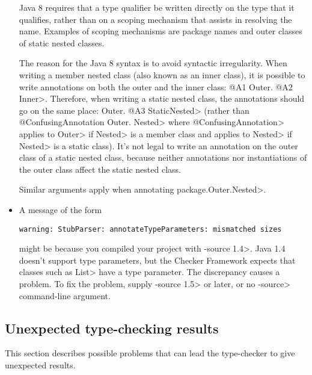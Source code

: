 \begin{itemize}
Java 8 requires that a type qualifier be written directly on the type that
it qualifies, rather than on a scoping mechanism that assists in resolving
the name.  Examples of scoping mechanisms are package names and outer
classes of static nested classes.

The reason for the Java 8 syntax is to avoid syntactic irregularity.  When
writing a member nested class (also known as an inner class), it is
possible to write annotations on both the outer and the inner class:  \<@A1
Outer. @A2 Inner>.  Therefore, when writing a static nested class, the
annotations should go on the same place:  \<Outer. @A3 StaticNested> (rather
than \<@ConfusingAnnotation Outer. Nested> where
\<@ConfusingAnnotation> applies to \<Outer> if \<Nested> is a member class
and applies to \<Nested> if \<Nested> is a static class).  It's not legal
to write an annotation on the outer class of a static nested class, because
neither annotations nor instantiations of the outer class affect the static
nested class.

Similar arguments apply when annotating \<package.Outer.Nested>.

\item
A message of the form

\begin{Verbatim}
warning: StubParser: annotateTypeParameters: mismatched sizes
\end{Verbatim}

might be because you compiled your project with \<-source 1.4>.  Java 1.4
doesn't support type parameters, but the Checker Framework expects that
classes such as \<List> have a type parameter.  The discrepancy causes a
problem.  To fix the problem, supply \<-source 1.5> or later, or no
\<-source> command-line argument.

\end{itemize}


\subsection{Unexpected type-checking results\label{common-problems-typechecking}}

This section describes possible problems that can lead the type-checker to
give unexpected results.


